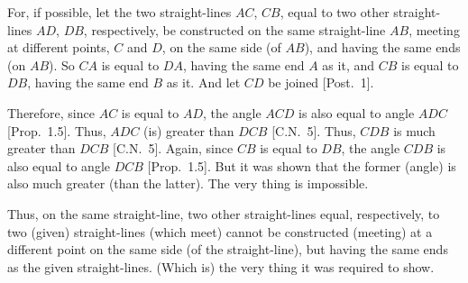 \begin{Parallel}{}{}
{\epsfysize=1.5in
\centerline{}

For, if possible, let the two straight-lines $AC$, $CB$, equal to two other straight-lines $AD$, $DB$, respectively, be constructed
on the same straight-line $AB$, meeting at different points, $C$ and $D$, on the
same side (of $AB$), and having the same ends (on $AB$). So $CA$ is equal to $DA$, having the same end $A$ as it, and $CB$ is equal to $DB$, having the
same end $B$ as it. And let $CD$ be joined [Post.~1].

Therefore, since $AC$ is equal to $AD$,  the angle $ACD$ is also equal to angle $ADC$ [Prop.~1.5].
Thus, $ADC$ (is) greater than $DCB$ [C.N.~5]. Thus, $CDB$ is much greater
than $DCB$ [C.N.~5]. Again, since  $CB$ is equal to $DB$, the angle $CDB$ is also equal to
angle $DCB$ [Prop.~1.5]. But it was shown that the former (angle) is also much
greater (than the latter). The very thing is impossible.

Thus, on the same straight-line, two other straight-lines equal, respectively, to  
two (given) straight-lines  (which meet) cannot be constructed (meeting)
at a different point on the same
side (of the straight-line), but having the same ends as the given straight-lines.
(Which is) the very thing it was required to show.}
\end{Parallel}

